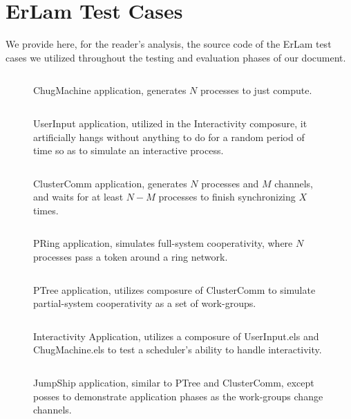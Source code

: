 \chapter{ErLam Test Cases}
%
\label{app:testcases}

We provide here, for the reader's analysis, the source code of the ErLam test 
cases we utilized throughout the testing and evaluation phases of our document.\\

\begin{figure}[h!]
\centering
\inputminted[frame=lines,fontsize=\footnotesize]{csharp}{code/ChugMachine.els}
\caption{ChugMachine application, generates $N$ processes to just compute.}
\label{fig:chugmachine-code}
\end{figure}

\begin{figure}
\centering
\inputminted[frame=lines,fontsize=\footnotesize]{csharp}{code/UserInput.els}
\caption{UserInput application, utilized in the Interactivity composure, it
artificially hangs without anything to do for a random period of time so as to
simulate an interactive process.}
\label{fig:userinput-code}
\end{figure}

\begin{figure}
\centering
\inputminted[frame=lines,fontsize=\footnotesize]{csharp}{code/ClusterComm.els}
\caption{ClusterComm application, generates $N$ processes and $M$ channels, and
waits for at least $N-M$ processes to finish synchronizing $X$ times.}
\label{fig:clustercomm-code}
\end{figure}

\begin{figure}
\centering
\inputminted[frame=lines,fontsize=\footnotesize]{csharp}{code/PRing.els}
\caption{PRing application, simulates full-system cooperativity, where $N$ processes
pass a token around a ring network.}
\label{fig:pring-code}
\end{figure}

\begin{figure}
\centering
\inputminted[frame=lines,fontsize=\footnotesize]{csharp}{code/PTree.els}
\caption{PTree application, utilizes composure of ClusterComm to simulate partial-system
cooperativity as a set of work-groups.}
\label{fig:ptree-code}
\end{figure}

\begin{figure}
\centering
\inputminted[frame=lines,fontsize=\footnotesize]{csharp}{code/Interactivity.els}
\caption{Interactivity Application, utilizes a composure of UserInput.els and ChugMachine.els
to test a scheduler's ability to handle interactivity.}
\label{fig:interactivity-code}
\end{figure}

\begin{figure}
\centering
\inputminted[frame=lines,fontsize=\footnotesize]{csharp}{code/JumpShip.els}
\caption{JumpShip application, similar to PTree and ClusterComm, except posses to 
demonstrate application phases as the work-groups change channels.}
\label{fig:jumpship-code}
\end{figure}

